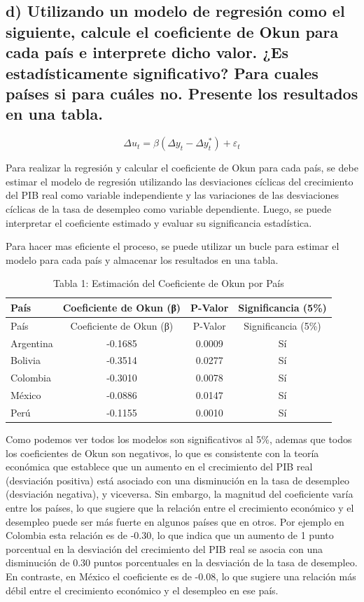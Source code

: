 \documentclass[
  11pt,
  letterpaper,
  DIV=11,
  numbers=noendperiod]{scrartcl}
\begin{document}
\subsection{d) Utilizando un modelo de regresión como el siguiente,
calcule el coeficiente de Okun para cada país e interprete dicho valor.
¿Es estadísticamente significativo? Para cuales países si para cuáles
no. Presente los resultados en una
tabla.}\label{d-utilizando-un-modelo-de-regresiuxf3n-como-el-siguiente-calcule-el-coeficiente-de-okun-para-cada-pauxeds-e-interprete-dicho-valor.-es-estaduxedsticamente-significativo-para-cuales-pauxedses-si-para-cuuxe1les-no.-presente-los-resultados-en-una-tabla.}

\[
\Delta u_t = \beta (\Delta y_t - \Delta y_t^*) + \varepsilon_t
\]

Para realizar la regresión y calcular el coeficiente de Okun para cada
país, se debe estimar el modelo de regresión utilizando las desviaciones
cíclicas del crecimiento del PIB real como variable independiente y las
variaciones de las desviaciones cíclicas de la tasa de desempleo como
variable dependiente. Luego, se puede interpretar el coeficiente
estimado y evaluar su significancia estadística.

Para hacer mas eficiente el proceso, se puede utilizar un bucle para
estimar el modelo para cada país y almacenar los resultados en una
tabla.

\begin{longtable}[]{@{}lccc@{}}
\caption{Tabla 1: Estimación del Coeficiente de Okun por
País}\tabularnewline
\toprule\noalign{}
País & Coeficiente de Okun (β) & P-Valor & Significancia (5\%) \\
\midrule\noalign{}
\endfirsthead
\toprule\noalign{}
País & Coeficiente de Okun (β) & P-Valor & Significancia (5\%) \\
\midrule\noalign{}
\endhead
\bottomrule\noalign{}
\endlastfoot
Argentina & -0.1685 & 0.0009 & Sí \\
Bolivia & -0.3514 & 0.0277 & Sí \\
Colombia & -0.3010 & 0.0078 & Sí \\
México & -0.0886 & 0.0147 & Sí \\
Perú & -0.1155 & 0.0010 & Sí \\
\end{longtable}

Como podemos ver todos los modelos son significativos al 5\%, ademas que
todos los coeficientes de Okun son negativos, lo que es consistente con
la teoría económica que establece que un aumento en el crecimiento del
PIB real (desviación positiva) está asociado con una disminución en la
tasa de desempleo (desviación negativa), y viceversa. Sin embargo, la
magnitud del coeficiente varía entre los países, lo que sugiere que la
relación entre el crecimiento económico y el desempleo puede ser más
fuerte en algunos países que en otros. Por ejemplo en Colombia esta
relación es de -0.30, lo que indica que un aumento de 1 punto porcentual
en la desviación del crecimiento del PIB real se asocia con una
disminución de 0.30 puntos porcentuales en la desviación de la tasa de
desempleo. En contraste, en México el coeficiente es de -0.08, lo que
sugiere una relación más débil entre el crecimiento económico y el
desempleo en ese país.
\end{document}

